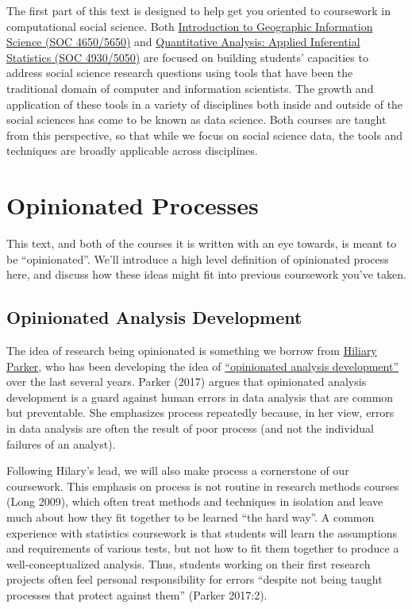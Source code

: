 \documentclass[]{book}
\theoremstyle{definition}
\theoremstyle{definition}
\theoremstyle{definition}
\theoremstyle{remark}
\begin{document}
The first part of this text is designed to help get you oriented to
coursework in computational social science. Both
\href{https://slu-soc5650.github.io}{Introduction to Geographic
Information Science (SOC 4650/5650)} and
\href{https://slu-soc5050.github.io}{Quantitative Analysis: Applied
Inferential Statistics (SOC 4930/5050)} are focused on building
students' capacities to address social science research questions using
tools that have been the traditional domain of computer and information
scientists. The growth and application of these tools in a variety of
disciplines both inside and outside of the social sciences has come to
be known as data science. Both courses are taught from this perspective,
so that while we focus on social science data, the tools and techniques
are broadly applicable across disciplines.

\section{Opinionated Processes}\label{opinionated-processes}

This text, and both of the courses it is written with an eye towards, is
meant to be ``opinionated''. We'll introduce a high level definition of
opinionated process here, and discuss how these ideas might fit into
previous coursework you've taken.

\subsection{Opinionated Analysis
Development}\label{opinionated-analysis-development}

The idea of research being opinionated is something we borrow from
\href{https://twitter.com/hspter}{Hiliary Parker}, who has been
developing the idea of
\href{https://peerj.com/preprints/3210/}{``opinionated analysis
development''} over the last several years. Parker (2017) argues that
opinionated analysis development is a guard against human errors in data
analysis that are common but preventable. She emphasizes process
repeatedly because, in her view, errors in data analysis are often the
result of poor process (and not the individual failures of an analyst).

Following Hilary's lead, we will also make process a cornerstone of our
coursework. This emphasis on process is not routine in research methods
courses (Long 2009), which often treat methods and techniques in
isolation and leave much about how they fit together to be learned ``the
hard way''. A common experience with statistics coursework is that
students will learn the assumptions and requirements of various tests,
but not how to fit them together to produce a well-conceptualized
analysis. Thus, students working on their first research projects often
feel personal responsibility for errors ``despite not being taught
processes that protect against them'' (Parker 2017:2).
\end{document}
